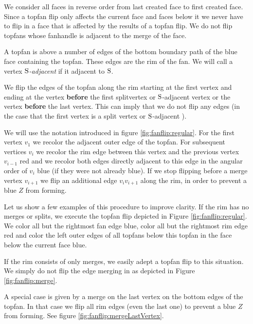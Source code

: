   We consider all faces in reverse order from last created face to first created face. Since a topfan flip only affects the current face and faces below it we never have to flip in a face that is affected by the results of a topfan flip.
  We do not flip topfans whose fanhandle is adjacent to the merge of the face. 

  A topfan is above a number of edges of the bottom boundary path of the blue face containing the topfan. These edges are the rim of the fan. We will call a vertex \emph{$\mathrm{S}$-adjacent} if it adjacent to $\mathrm{S}$.

  We flip the edges of the topfan along the rim starting at the first vertex and ending at the vertex \textbf{before} the first splitvertex or $\mathrm{S}$-adjacent vertex or the vertex \textbf{before} the last vertex. This can imply that we do not flip any edges (in the case that the first vertex is a split vertex or $\mathrm{S}$-adjacent ).

  We will use the notation introduced in figure \ref{fig:fanflip:regular}.
  For the first vertex $v_1$ we recolor the adjacent outer edge of the topfan. For subsequent vertices $v_i$ we recolor the rim edge between this vertex and the previous vertex $v_{i-1}$ red and we recolor both edges directly adjacent to this edge in the angular order of $v_i$ blue (if they were not already blue).
  If we stop flipping before a merge vertex $v_{i+1}$ we flip an additional edge $v_i v_{i+1}$ along the rim, in order to prevent a blue $Z$ from forming.


  Let us show a few examples of this procedure to improve clarity.
  If the rim has no merges or splits, we execute the topfan flip depicted in Figure \ref{fig:fanflip:regular}.
  We color all but the rightmost fan edge blue, color all but the rightmost rim edge red and color the left outer edges of all topfans below this topfan in the face below the current face blue.

  If the rim consists of only merges, we easily adept a topfan flip to this situation. We simply do not flip the edge merging in as depicted in Figure \ref{fig:fanflip:merge}.

  A special case is given by a merge on the last vertex on the bottom edges of the topfan. In that case we flip all rim edges (even the last one) to prevent a blue $Z$ from forming. See figure \ref{fig:fanflip:mergeLastVertex}.

